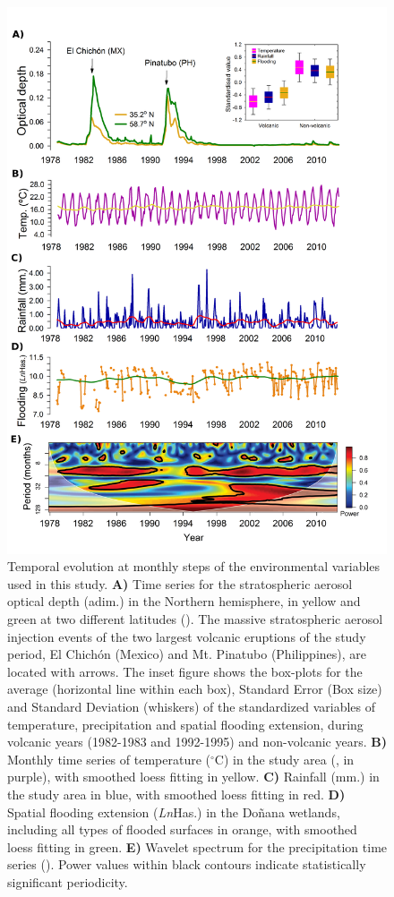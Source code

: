 \documentclass[12pt]{article}
\begin{document}
	\begin{figure}[t]
		\centering
		\includegraphics[width=0.6\linewidth]{processed_figs/Environ_clim_ts}
		\caption[Environmental and stratospheric aerosol optical depth time series]{Temporal evolution at monthly steps of the environmental variables used in this study. \textbf{A)} Time series for the stratospheric aerosol optical depth (adim.) in the Northern hemisphere, in yellow and green at two different latitudes (\cite{Booth2012}). The massive stratospheric aerosol injection events of the two largest volcanic eruptions of the study period, El Chichón (Mexico) and Mt. Pinatubo (Philippines), are located with arrows. The inset figure shows the box-plots for the average (horizontal line within each box), Standard Error (Box size) and Standard Deviation (whiskers) of the standardized variables of temperature, precipitation and spatial flooding extension, during volcanic years (1982-1983 and 1992-1995) and non-volcanic years. \textbf{B)} Monthly time series of temperature ($^\circ \mathrm{C}$) in the study area (\cite{Almaraz2012}, in purple), with smoothed loess fitting in yellow. \textbf{C)} Rainfall (mm.) in the study area in blue, with smoothed loess fitting in red. \textbf{D)} Spatial flooding extension (\textit{Ln}Has.) in the Doñana wetlands, including all types of flooded surfaces in orange, with smoothed loess fitting in green. \textbf{E)} Wavelet spectrum for the precipitation time series (\cite{Cazelles2008}). Power values within black contours indicate statistically significant periodicity.}
		\label{fig:StructChanFullDoniana}
	\end{figure}
	
\end{document}
